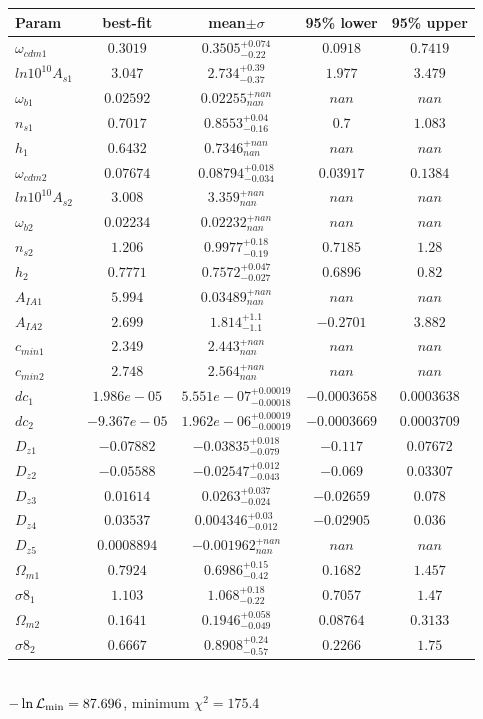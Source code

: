 \begin{tabular}{|l|c|c|c|c|} 
 \hline 
Param & best-fit & mean$\pm\sigma$ & 95\% lower & 95\% upper \\ \hline 
$\omega_{cdm 1 }$ &$0.3019$ & $0.3505_{-0.22}^{+0.074}$ & $0.0918$ & $0.7419$ \\ 
$ln10^{10}A_{s 1 }$ &$3.047$ & $2.734_{-0.37}^{+0.39}$ & $1.977$ & $3.479$ \\ 
$\omega_{b 1 }$ &$0.02592$ & $0.02255_{nan}^{+nan}$ & $nan$ & $nan$ \\ 
$n_{s 1 }$ &$0.7017$ & $0.8553_{-0.16}^{+0.04}$ & $0.7$ & $1.083$ \\ 
$h_{1 }$ &$0.6432$ & $0.7346_{nan}^{+nan}$ & $nan$ & $nan$ \\ 
$\omega_{cdm 2 }$ &$0.07674$ & $0.08794_{-0.034}^{+0.018}$ & $0.03917$ & $0.1384$ \\ 
$ln10^{10}A_{s 2 }$ &$3.008$ & $3.359_{nan}^{+nan}$ & $nan$ & $nan$ \\ 
$\omega_{b 2 }$ &$0.02234$ & $0.02232_{nan}^{+nan}$ & $nan$ & $nan$ \\ 
$n_{s 2 }$ &$1.206$ & $0.9977_{-0.19}^{+0.18}$ & $0.7185$ & $1.28$ \\ 
$h_{2 }$ &$0.7771$ & $0.7572_{-0.027}^{+0.047}$ & $0.6896$ & $0.82$ \\ 
$A_{IA 1 }$ &$5.994$ & $0.03489_{nan}^{+nan}$ & $nan$ & $nan$ \\ 
$A_{IA 2 }$ &$2.699$ & $1.814_{-1.1}^{+1.1}$ & $-0.2701$ & $3.882$ \\ 
$c_{min 1 }$ &$2.349$ & $2.443_{nan}^{+nan}$ & $nan$ & $nan$ \\ 
$c_{min 2 }$ &$2.748$ & $2.564_{nan}^{+nan}$ & $nan$ & $nan$ \\ 
$dc_{1 }$ &$1.986e-05$ & $5.551e-07_{-0.00018}^{+0.00019}$ & $-0.0003658$ & $0.0003638$ \\ 
$dc_{2 }$ &$-9.367e-05$ & $1.962e-06_{-0.00019}^{+0.00019}$ & $-0.0003669$ & $0.0003709$ \\ 
$D_{z1 }$ &$-0.07882$ & $-0.03835_{-0.079}^{+0.018}$ & $-0.117$ & $0.07672$ \\ 
$D_{z2 }$ &$-0.05588$ & $-0.02547_{-0.043}^{+0.012}$ & $-0.069$ & $0.03307$ \\ 
$D_{z3 }$ &$0.01614$ & $0.0263_{-0.024}^{+0.037}$ & $-0.02659$ & $0.078$ \\ 
$D_{z4 }$ &$0.03537$ & $0.004346_{-0.012}^{+0.03}$ & $-0.02905$ & $0.036$ \\ 
$D_{z5 }$ &$0.0008894$ & $-0.001962_{nan}^{+nan}$ & $nan$ & $nan$ \\ 
$\Omega_{m 1 }$ &$0.7924$ & $0.6986_{-0.42}^{+0.15}$ & $0.1682$ & $1.457$ \\ 
$\sigma8_{1 }$ &$1.103$ & $1.068_{-0.22}^{+0.18}$ & $0.7057$ & $1.47$ \\ 
$\Omega_{m 2 }$ &$0.1641$ & $0.1946_{-0.049}^{+0.058}$ & $0.08764$ & $0.3133$ \\ 
$\sigma8_{2 }$ &$0.6667$ & $0.8908_{-0.57}^{+0.24}$ & $0.2266$ & $1.75$ \\ 
\hline 
 \end{tabular} \\ 
$-\ln{\cal L}_\mathrm{min} =87.696$, minimum $\chi^2=175.4$ \\ 
